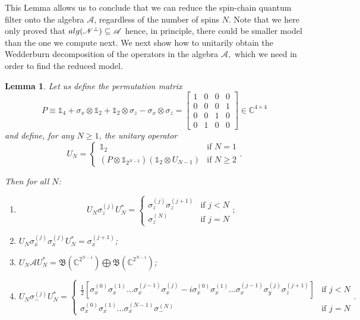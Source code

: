 \documentclass[aihp,12pt]{imsart}
\newcommand{\As}{\mathscr{A}}
\newcommand{\Ns}{\mathscr{N}}
\newcommand{\Cb}{\mathbb{C}}
\newcommand{\Bf}{\mathfrak{B}}
\newcommand{\one}{\mathbb{1}}
\newcommand{\alg}{{\rm alg}}
\theoremstyle{theorem}
\newtheorem{lemma}{Lemma}
\theoremstyle{definition}
\theoremstyle{remark}
\begin{document}
This Lemma allows us to conclude that we can reduce the spin-chain quantum filter onto the algebra $\As$, regardless of the number of spins $N$. Note that we here only proved that $\alg(\Ns^\perp) \subseteq \As$ hence, in principle, there could be smaller model than the one we compute next. 
We next show how to unitarily obtain the Wedderburn decomposition of the operators in the algebra $\As,$ which we need in order to find the reduced model. 

\begin{lemma}
    Let us define the permutation matrix \[P \equiv \one_4 + \sigma_x\otimes\one_2 + \one_2\otimes\sigma_z  -\sigma_x\otimes\sigma_z = \begin{bmatrix}
        1&0&0&0\\0&0&0&1\\0&0&1&0\\0&1&0&0
    \end{bmatrix} \in\Cb^{4\times4}\] and define, for any $N\geq1$, the unitary operator \[U_N = \begin{cases}
        \one_2 & \text{if }N=1\\
        (P\otimes\one_{2^{N-2}})(\one_2\otimes U_{N-1}) &\text{if } N\geq2
    \end{cases}.\]

    Then for all $N$: 
    \begin{enumerate}
        \item \[U_N \sigma_z^{(j)} U_N^* = \begin{cases}
            \sigma_z^{(j)}\sigma_z^{(j+1)}&\text{if }j<N\\
            \sigma_z^{(N)}&\text{if }j=N
        \end{cases};\]
        \item \(U_N \sigma_x^{(j)}\sigma_x^{(j)} U_N^* = \sigma_x^{(j+1)}\);
        \item $U_N \As U_N^* = \Bf(\Cb^{2^{N-1}}) \bigoplus \Bf(\Cb^{2^{N-1}})$;
        \item 
        \[U_N \sigma_-^{(j)} U_N^* =\begin{cases}
            \frac{1}{2}\left[\sigma_x^{(0)}\sigma_x^{(1)}\dots\sigma_x^{(j-1)}\sigma_x^{(j)} -i \sigma_x^{(0)}\sigma_x^{(1)}\dots\sigma_x^{(j-1)}\sigma_y^{(j)} \sigma_z^{(j+1)} \right]&\text{if }j < N\\
            \sigma_x^{(0)}\sigma_x^{(1)}\dots\sigma_x^{(N-1)}\sigma_-^{(N)}&\text{if }j=N
        \end{cases}. \]
    \end{enumerate}
\end{lemma}
\end{document}
